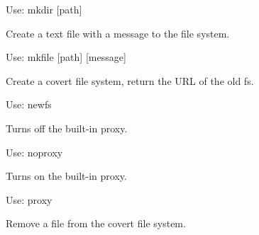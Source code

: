\documentclass[letterpaper,10pt,english]{sphinxmanual}
\begin{document}
\begin{fulllineitems}
\begin{fulllineitems}
Use: mkdir {[}path{]}

\end{fulllineitems}


\begin{fulllineitems}
\label{main:main.Console.do_mkfile}
Create a text file with a message to the file system.

Use: mkfile {[}path{]} {[}message{]}

\end{fulllineitems}


\begin{fulllineitems}
\label{main:main.Console.do_mount}
\end{fulllineitems}


\begin{fulllineitems}
\label{main:main.Console.do_newfs}
Create a covert file system, return the URL of the old fs.

Use: newfs

\end{fulllineitems}


\begin{fulllineitems}
\label{main:main.Console.do_noproxy}
Turns off the built-in proxy.

Use: noproxy

\end{fulllineitems}


\begin{fulllineitems}
\label{main:main.Console.do_proxy}
Turns on the built-in proxy.

Use: proxy

\end{fulllineitems}


\begin{fulllineitems}
\label{main:main.Console.do_rm}
Remove a file from the covert file system.


\end{fulllineitems}
\end{fulllineitems}
\end{document}
